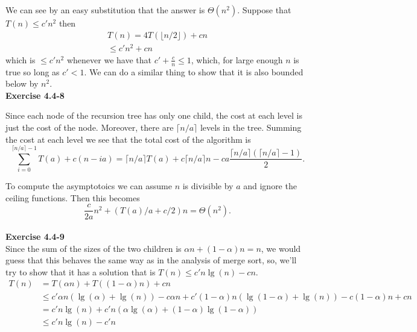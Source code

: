 \documentclass{article}
\begin{document}
We can see by an easy substitution that the answer is $\Theta(n^2)$. Suppose that $T(n) \le c' n^2$ then
\begin{align*}
T(n) = 4T(\lfloor n/2\rfloor) + cn\\
\le c' n^2 + cn
\end{align*}
which is $\le c'n^2$ whenever we have that $c' + \frac{c}{n} \le 1$, which, for large enough $n$ is true so long as $c' <1$. We can do a similar thing to show that it is also bounded below by $n^2$.\\

\noindent\textbf{Exercise 4.4-8}\\


Since each node of the recursion tree has only one child, the cost at each level is just the cost of the node.  Moreover, there are $\lceil n/a \rceil$ levels in the tree.  Summing the cost at each level we see that the total cost of the algorithm is 
\[ \sum_{i=0}^{\lceil n/a \rceil - 1} T(a) + c(n-ia) = \lceil n/a \rceil T(a) + c\lceil n/a \rceil n - ca \frac{\lceil n/a \rceil(\lceil n/a \rceil - 1)}{2}.\]

To compute the asymptotoics we can assume $n$ is divisible by $a$ and ignore the ceiling functions.  Then this becomes
\[ \frac{c}{2a}n^2 + (T(a)/a + c/2)n = \Theta(n^2).\]\\

\noindent\textbf{Exercise 4.4-9}\\

Since the sum of the sizes of the two children is $\alpha n + (1-\alpha) n = n$, we would guess that this behaves the same way as in the analysis of merge sort, so, we'll try to show that it has a solution that is $T(n) \le c' n\lg(n)-cn$. 
\begin{align*}
T(n)&= T(\alpha n)+ T((1-\alpha)n) + cn\\
&\le c'\alpha n (\lg(\alpha)+\lg(n)) - c\alpha n + c'(1-\alpha) n (\lg(1-\alpha) + \lg(n)) - c(1-\alpha) n + cn\\
&= c'n\lg(n) + c'n( \alpha\lg(\alpha) + (1-\alpha)\lg(1-\alpha))\\
& \le  c'n\lg(n) - c'n
\end{align*}
\end{document}
